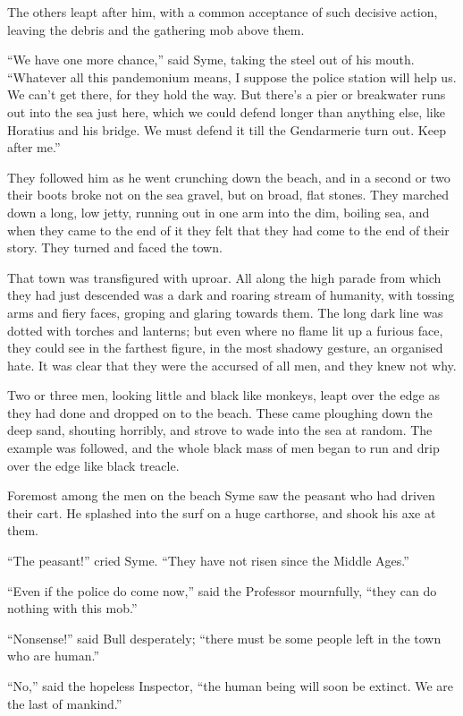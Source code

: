 The others leapt after him, with a common acceptance of such decisive action, leaving the debris and the gathering mob above them.

“We have one more chance,” said Syme, taking the steel out of his mouth. “Whatever all this pandemonium means, I suppose the police station will help us. We can’t get there, for they hold the way. But there’s a pier or breakwater runs out into the sea just here, which we could defend longer than anything else, like Horatius and his bridge. We must defend it till the Gendarmerie turn out. Keep after me.”

They followed him as he went crunching down the beach, and in a second or two their boots broke not on the sea gravel, but on broad, flat stones. They marched down a long, low jetty, running out in one arm into the dim, boiling sea, and when they came to the end of it they felt that they had come to the end of their story. They turned and faced the town.

That town was transfigured with uproar. All along the high parade from which they had just descended was a dark and roaring stream of humanity, with tossing arms and fiery faces, groping and glaring towards them. The long dark line was dotted with torches and lanterns; but even where no flame lit up a furious face, they could see in the farthest figure, in the most shadowy gesture, an organised hate. It was clear that they were the accursed of all men, and they knew not why.

Two or three men, looking little and black like monkeys, leapt over the edge as they had done and dropped on to the beach. These came ploughing down the deep sand, shouting horribly, and strove to wade into the sea at random. The example was followed, and the whole black mass of men began to run and drip over the edge like black treacle.

Foremost among the men on the beach Syme saw the peasant who had driven their cart. He splashed into the surf on a huge carthorse, and shook his axe at them.

“The peasant!” cried Syme. “They have not risen since the Middle Ages.”

“Even if the police do come now,” said the Professor mournfully, “they can do nothing with this mob.”

“Nonsense!” said Bull desperately; “there must be some people left in the town who are human.”

“No,” said the hopeless Inspector, “the human being will soon be extinct. We are the last of mankind.”

